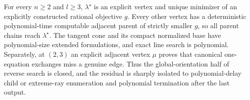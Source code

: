 For every \(n\ge2\) and \(l\ge3\), \(\lambda^\star\) is an explicit vertex and unique minimizer of an explicitly constructed rational objective \(g\). Every other vertex has a deterministic polynomial-time computable adjacent parent of strictly smaller \(g\), so all parent chains reach \(\lambda^\star\). The tangent cone and its compact normalized base have polynomial-size extended formulations, and exact line search is polynomial. Separately, at \((2,3)\) an explicit adjacent vertex \(\mu\) proves that canonical one-equation exchanges miss a genuine edge. Thus the global-orientation half of reverse search is closed, and the residual is sharply isolated to polynomial-delay child or extreme-ray enumeration and polynomial termination after the last output.
